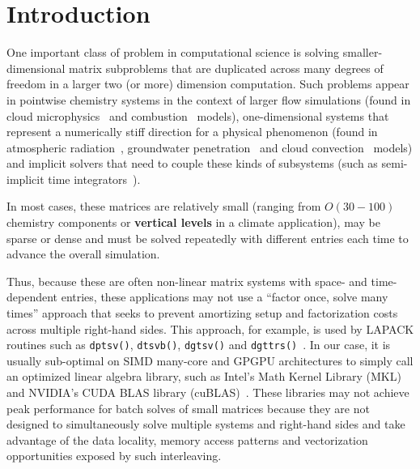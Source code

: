 \documentclass[10pt, conference, compsocconf]{IEEEtran}
\begin{document}
\section{Introduction}
\label{sec:intro}

One important class of problem in computational science is solving
  smaller-dimensional matrix subproblems that are duplicated across
  many degrees of freedom in a larger two (or more) dimension computation.
Such problems appear in
  pointwise chemistry systems in the context of larger 
    flow simulations (found in cloud microphysics~\cite{climate_mg2} and
    combustion~\cite{combustion_pazner} models),
  one-dimensional systems that represent a numerically stiff
    direction for a physical phenomenon (found in atmospheric
    radiation~\cite{climate_rrtmg}, groundwater
    penetration~\cite{pflotran_groundwater} and cloud
    convection~\cite{climate_sam} models) and
  implicit solvers that need to couple these kinds of subsystems
    (such as semi-implicit time integrators~\cite{imex}).

In most cases, these matrices are relatively small 
  (ranging from \(O(30-100)\) chemistry components or \textbf{vertical levels}
  in a climate application), may be sparse or dense and must be solved
  repeatedly with different entries each time to advance the overall simulation.

Thus, because these are often non-linear matrix systems with space- and 
  time-dependent entries, these applications may not use a 
  ``factor once, solve many times'' approach that seeks to prevent amortizing
  setup and factorization costs across multiple right-hand sides.
This approach, for example, is used by 
  LAPACK routines such as \lstinline{dptsv()}, \lstinline{dtsvb()},
  \lstinline{dgtsv()} and
  \lstinline{dgttrs()}~\cite{mkl}.
In our case, it is usually sub-optimal on SIMD many-core and GPGPU
  architectures to simply call an optimized linear algebra library, 
  such as Intel's Math Kernel Library (MKL)~\cite{mkl} and NVIDIA's
  CUDA BLAS library (cuBLAS)~\cite{cublas}.
These libraries may not achieve peak performance for batch solves of small
  matrices because they are not designed to simultaneously solve multiple systems
  and right-hand sides and take advantage of the data locality, memory
  access patterns and vectorization opportunities exposed by such interleaving. 
  
\end{document}

